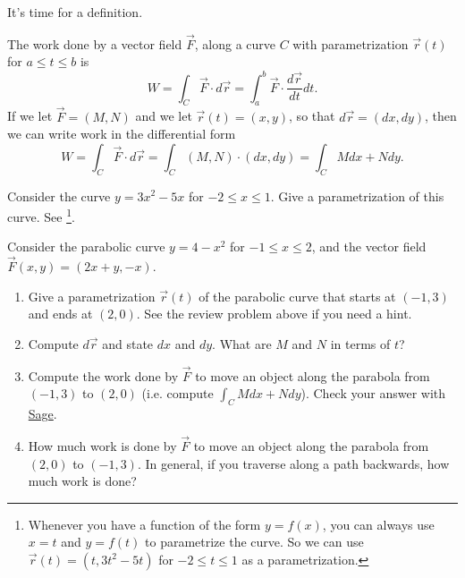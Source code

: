 It's time for a definition. 
\begin{definition}
The work done by a vector field $\vec F$, along a curve $C$ with parametrization $\vec r(t)$ for $a\leq t\leq b$ is
$$W = \int_C \vec F\cdot d\vec r= \int_a^b \vec F\cdot \frac{d\vec r}{dt}dt.$$
If we let $\vec F = (M,N)$ and we let $\vec r(t)=(x,y)$, so that $d\vec r = (dx,dy)$, 
then we can write work in the differential form 
$$W = \int_C \vec F\cdot d\vec r= \int_C (M,N)\cdot (dx,dy) = \int_C Mdx+Ndy.$$
\end{definition}

\begin{review*}
 Consider the curve $y=3x^2-5x$ for $-2\leq x\leq 1$.  Give a parametrization of this curve. See \footnote{Whenever you have a function of the form $y=f(x)$, you can always use $x=t$ and $y=f(t)$ to parametrize the curve.  So we can use $\vec r(t) = (t, 3t^2-5t)$ for $-2\leq t\leq 1$ as a parametrization.}. 
\end{review*}


\begin{problem}
%
 Consider the parabolic curve $y=4-x^2$ for $-1\leq x\leq 2$, and the vector field $\vec F(x,y) = (2x+y,-x)$. 
\begin{enumerate}
 \item Give a parametrization $\vec r(t)$ of the parabolic curve that starts at $(-1,3)$ and ends at $(2,0)$.  See the review problem above if you need a hint.
 \item Compute $d\vec r$ and state $dx$ and $dy$. What are $M$ and $N$ in terms of $t$?
 \item Compute the work done by $\vec F$ to move an object along the parabola from $(-1,3)$ to $(2,0)$ (i.e. compute $\int _C Mdx+Ndy$). Check your answer with \href{\sageworkurl}{Sage}. 
 \item How much work is done by $\vec F$ to move an object along the parabola from $(2,0)$ to $(-1,3)$.  In general, if you traverse along a path backwards, how much work is done?  
\end{enumerate}
\end{problem}

